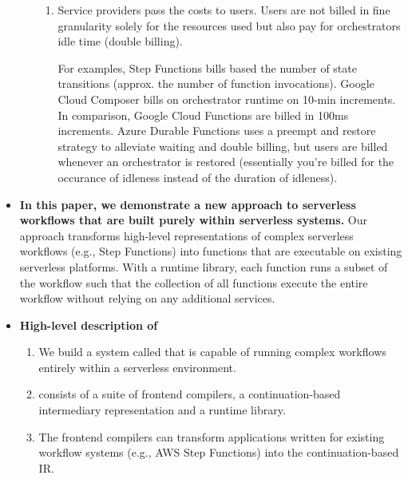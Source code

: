 \begin{itemize}
\begin{enumerate}
\begin{enumerate}
          \item Service providers pass the costs to users. Users are not
          billed in fine granularity solely for the resources used but also
          pay for orchestrators idle time (double billing).

          For examples, Step Functions bills based the number of state
          transitions (approx. the number of function invocations). Google
          Cloud Composer bills on orchestrator runtime on 10-min increments.
          In comparison, Google Cloud Functions are billed in 100ms
          increments. Azure Durable Functions uses a preempt and restore
          strategy to alleviate waiting and double billing, but users are
          billed whenever an orchestrator is restored (essentially you're
          billed for the occurance of idleness instead of the duration of
          idleness).

        \end{enumerate}

    \end{enumerate}

  \item \textbf{In this paper, we demonstrate a new approach to serverless
  workflows that are built purely within serverless systems.} Our approach
  transforms high-level representations of complex serverless workflows (e.g.,
  Step Functions) into functions that are executable on existing serverless
  platforms. With a runtime library, each function runs a subset of the
  workflow such that the collection of all functions execute the entire
  workflow without relying on any additional services.

  \item \textbf{High-level description of \name{}}

    \begin{enumerate}

      \item We build a system called \name{} that is capable of running
      complex workflows entirely within a serverless environment.

      \item \name{} consists of a suite of frontend compilers, a
      continuation-based intermediary representation and a runtime library.

      \item The frontend compilers can transform applications written for
      existing workflow systems (e.g., AWS Step Functions) into the
      continuation-based
      \name{} IR.


\end{enumerate}
\end{itemize}
